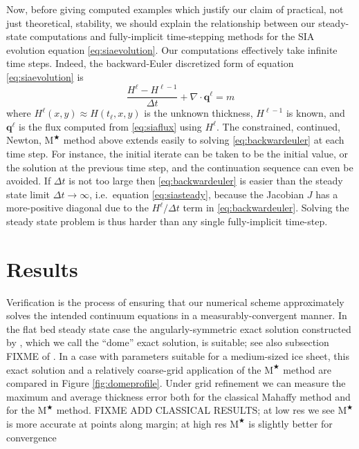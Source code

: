\documentclass[twocolumn,letterpaper]{igs}
\newcommand\bq{\mathbf{q}}
\newcommand{\Div}{\nabla\cdot}
\newcommand{\Mstar}{$\text{M}^{\bigstar}$\xspace}
\begin{document}
Now, before giving computed examples which justify our claim of practical, not just theoretical, stability, we should explain the relationship between our steady-state computations and fully-implicit time-stepping methods for the SIA evolution equation \eqref{eq:siaevolution}.  Our computations effectively take infinite time steps.  Indeed, the backward-Euler \citep{MortonMayers2005} discretized form of equation \eqref{eq:siaevolution} is
\begin{equation}
\frac{H^\ell - H^{\ell-1}}{\Delta t} + \Div \bq^\ell = m \label{eq:backwardeuler}
\end{equation}
where $H^\ell(x,y) \approx H(t_\ell,x,y)$ is the unknown thickness, $H^{\ell-1}$ is known, and $\bq^\ell$ is the flux computed from \eqref{eq:siaflux} using $H^\ell$.  The constrained, continued, Newton, \Mstar method above extends easily to solving \eqref{eq:backwardeuler} at each time step.  For instance, the initial iterate can be taken to be the initial value, or the solution at the previous time step, and the continuation sequence can even be avoided.  If $\Delta t$ is not too large then \eqref{eq:backwardeuler} is easier than the steady state limit $\Delta t\to \infty$, i.e.~equation \eqref{eq:siasteady}, because the Jacobian $J$ has a more-positive diagonal due to the $H^\ell/\Delta t$ term in \eqref{eq:backwardeuler}.  Solving the steady state problem is thus harder than any single fully-implicit time-step.


\section{Results}

Verification is the process of ensuring that our numerical scheme approximately solves the intended continuum equations in a measurably-convergent manner.  In the flat bed steady state case the angularly-symmetric exact solution constructed by \cite{Bueler2003}, which we call the ``dome'' exact solution, is suitable; see also subsection FIXME of \cite{vanderVeen2013}.  In a case with parameters suitable for a medium-sized ice sheet, this exact solution and a relatively coarse-grid application of the \Mstar method are compared in Figure \ref{fig:domeprofile}.  Under grid refinement we can measure the maximum and average thickness error both for the classical Mahaffy method and for the \Mstar method.  FIXME ADD CLASSICAL RESULTS; at low res we see \Mstar is more accurate at points along margin; at high res \Mstar is slightly better for convergence
\end{document}
